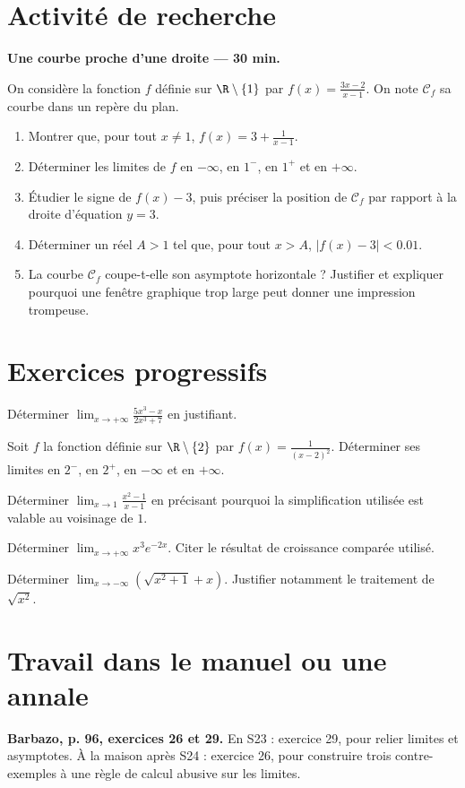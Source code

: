 \mxnewpage
\section{Activité de recherche}\textbf{Une courbe proche d'une droite --- 30 min.}\par On considère la fonction $f$ définie sur $\R\setminus\{1\}$ par $f(x)=\frac{3x-2}{x-1}$. On note $\mathcal C_f$ sa courbe dans un repère du plan.
\begin{enumerate}\item Montrer que, pour tout $x\ne1$, $f(x)=3+\frac1{x-1}$.
\item Déterminer les limites de $f$ en $-\infty$, en $1^-$, en $1^+$ et en $+\infty$.
\item Étudier le signe de $f(x)-3$, puis préciser la position de $\mathcal C_f$ par rapport à la droite d'équation $y=3$.
\item Déterminer un réel $A>1$ tel que, pour tout $x>A$, $|f(x)-3|<\num{0,01}$.
\item La courbe $\mathcal C_f$ coupe-t-elle son asymptote horizontale ? Justifier et expliquer pourquoi une fenêtre graphique trop large peut donner une impression trompeuse.\end{enumerate}

\mxnewpage
\section{Exercices progressifs}

Déterminer $\displaystyle\lim_{x\to+\infty}\frac{5x^3-x}{2x^3+7}$ en justifiant.

Soit $f$ la fonction définie sur $\R\setminus\{2\}$ par $f(x)=\frac1{(x-2)^2}$. Déterminer ses limites en $2^-$, en $2^+$, en $-\infty$ et en $+\infty$.

Déterminer $\displaystyle\lim_{x\to1}\frac{x^2-1}{x-1}$ en précisant pourquoi la simplification utilisée est valable au voisinage de $1$.

Déterminer $\displaystyle\lim_{x\to+\infty}x^3e^{-2x}$. Citer le résultat de croissance comparée utilisé.

Déterminer $\displaystyle\lim_{x\to-\infty}\left(\sqrt{x^2+1}+x\right)$. Justifier notamment le traitement de $\sqrt{x^2}$.

\section{Travail dans le manuel ou une annale}\textbf{Barbazo, p. 96, exercices 26 et 29.} En S23 : exercice 29, pour relier limites et asymptotes. À la maison après S24 : exercice 26, pour construire trois contre-exemples à une règle de calcul abusive sur les limites.

